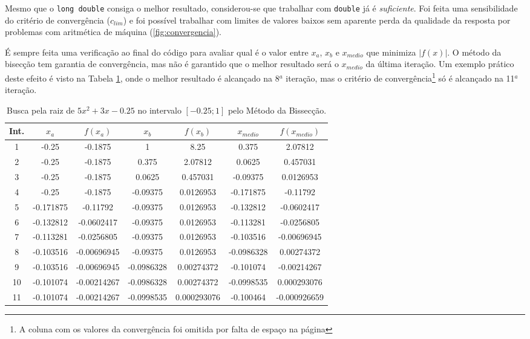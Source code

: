 \documentclass[final,3p,12pt]{elsarticle}
\begin{document}
    Mesmo que o \verb|long double| consiga o melhor resultado, considerou-se que trabalhar com \verb|double| já é \emph{suficiente}. Foi feita uma sensibilidade do critério de convergência ($c_{lim}$) e foi possível trabalhar com limites de valores baixos sem aparente perda da qualidade da resposta por problemas com aritmética de máquina (\ref{fig:convergencia}).

    É sempre feita uma verificação ao final do código para avaliar qual é o valor entre $x_a$, $x_b$ e $x_{medio}$ que minimiza $|f(x)|$. O método da bisecção tem garantia de convergência, mas não é garantido que o melhor resultado será o $x_{medio}$ da última iteração. Um exemplo prático deste efeito é visto na Tabela \ref{tab:fquad}, onde o melhor resultado é alcançado na 8$^a$ iteração, mas o critério de convergência\footnote{A coluna com os valores da convergência foi omitida por falta de espaço na página} só é alcançado na 11$^a$ iteração.
    
    \begin{table}[h!] 
        \centering
        \caption{Busca pela raiz de $5x^2+3x-0.25$ no intervalo $[-0.25; 1]$ pelo Método da Bissecção.}
        \begin{tabular}{ c c c c c c c }
            Int. & $x_a$   & $f(x_a)$    & $x_b$      & $f(x_b)$    & $x_{medio}$ & $f(x_{medio})$  \\
            \hline
             1 &     -0.25 &     -0.1875 &          1 &        8.25 &      0.375 &     2.07812   \\
             2 &     -0.25 &     -0.1875 &      0.375 &     2.07812 &     0.0625 &    0.457031   \\
             3 &     -0.25 &     -0.1875 &     0.0625 &    0.457031 &   -0.09375 &   0.0126953   \\
             4 &     -0.25 &     -0.1875 &   -0.09375 &   0.0126953 &  -0.171875 &    -0.11792   \\
             5 & -0.171875 &    -0.11792 &   -0.09375 &   0.0126953 &  -0.132812 &  -0.0602417   \\
             6 & -0.132812 &  -0.0602417 &   -0.09375 &   0.0126953 &  -0.113281 &  -0.0256805   \\
             7 & -0.113281 &  -0.0256805 &   -0.09375 &   0.0126953 &  -0.103516 & -0.00696945   \\
             8 & -0.103516 & -0.00696945 &   -0.09375 &   0.0126953 & -0.0986328 &  0.00274372   \\
             9 & -0.103516 & -0.00696945 & -0.0986328 &  0.00274372 &  -0.101074 & -0.00214267   \\
            10 & -0.101074 & -0.00214267 & -0.0986328 &  0.00274372 & -0.0998535 & 0.000293076   \\
            11 & -0.101074 & -0.00214267 & -0.0998535 & 0.000293076 &  -0.100464 & -0.000926659 
        \end{tabular}
        \label{tab:fquad}
    \end{table}
    
\end{document}
